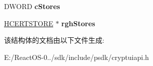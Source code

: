 \begin{DoxyCompactItemize}
\begin{tabbing}
\end{tabbing}\item 
\mbox{\label{struct___c_r_y_p_t_u_i___w_i_z___e_x_p_o_r_t___i_n_f_o_abd200c8d5cea5c337529289ca8d28c9c}} 
D\+W\+O\+RD {\bfseries c\+Stores}
\item 
\mbox{\label{struct___c_r_y_p_t_u_i___w_i_z___e_x_p_o_r_t___i_n_f_o_ad986bf5c6245844f65d531d234880cee}} 
\hyperlink{interfacevoid}{H\+C\+E\+R\+T\+S\+T\+O\+RE} $\ast$ {\bfseries rgh\+Stores}
\end{DoxyCompactItemize}


该结构体的文档由以下文件生成\+:\begin{DoxyCompactItemize}
\item 
E\+:/\+React\+O\+S-\/0../sdk/include/psdk/cryptuiapi.\+h\end{DoxyCompactItemize}
